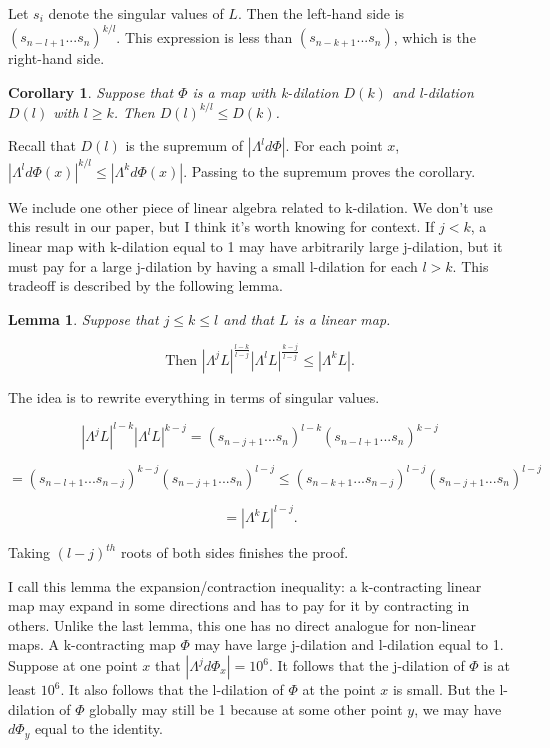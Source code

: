 \documentclass{amsart}
\newtheorem*{Theorem 1}{Theorem 1}
\newtheorem*{Theorem 2}{Theorem 2}
\newtheorem*{Estimate 1}{Estimate 1}
\newtheorem*{Estimate 2}{Estimate 2}
\newtheorem*{key lemma}{Key Lemma}
\newtheorem{lemma}{Lemma}[section]
\newtheorem{corollary}{Corollary}[section]
\numberwithin{equation}{section}
\begin{document}
\proof Let $s_i$ denote the singular values of $L$.  Then the left-hand
side is $(s_{n-l+1} ... s_n)^{k/l}$.  This expression is less than
$(s_{n-k+1} ... s_n)$, which is the right-hand side. \endproof

\begin{corollary} Suppose that $\Phi$ is a map with k-dilation
$D(k)$ and l-dilation $D(l)$ with $l \ge k$.  Then
$D(l)^{k/l} \le D(k)$.
\end{corollary}

\proof Recall that $D(l)$ is the supremum of $| \Lambda^l d \Phi |$.  For
each point $x$, $| \Lambda^l d \Phi(x)|^{k/l} \le |\Lambda^k d \Phi(x)|$.
Passing to the supremum proves the corollary. \endproof

We include one other piece of linear algebra related to
k-dilation.  We don't use this result in our paper, but I think
it's worth knowing for context.  If $j < k$, a linear map with
k-dilation equal to 1 may have arbitrarily large j-dilation, but
it must pay for a large j-dilation by having a small l-dilation
for each $l > k$.  This tradeoff is described by the following
lemma.

\begin{lemma} Suppose that $j \le k \le l$ and that $L$ is a linear map.

$$\textrm{Then } |\Lambda^j L|^{\frac{l-k}{l-j}} |\Lambda^l
L|^{\frac{k-j}{l-j}} \le |\Lambda^k L|.$$

\end{lemma}

\proof The idea is to rewrite everything in terms of singular values.

$$|\Lambda^j L|^{l-k} |\Lambda^l L|^{k-j} = (s_{n-j+1} ...
s_n)^{l-k} (s_{n-l+1} ... s_n)^{k-j}$$

$$ = (s_{n-l+1} ... s_{n-j})^{k-j} (s_{n-j+1} ... s_n)^{l-j} \le
(s_{n-k+1} ... s_{n-j})^{l-j} (s_{n-j+1} ... s_n)^{l-j}$$

$$ = |\Lambda^k L|^{l-j}.$$

Taking $(l-j)^{th}$ roots of both sides finishes the proof. \endproof

I call this lemma the expansion/contraction inequality: a
k-contracting linear map may expand in some directions and has to
pay for it by contracting in others.  Unlike the last lemma, this
one has no direct analogue for non-linear maps.  A k-contracting
map $\Phi$ may have large j-dilation and l-dilation equal to 1. 
Suppose at one point $x$ that $|\Lambda^j d \Phi_x| = 10^6$.  It
follows that the j-dilation of $\Phi$ is at least $10^6$. It also
follows that the l-dilation of $\Phi$ at the point $x$ is small. 
But the l-dilation of $\Phi$ globally may still be 1 because at
some other point $y$, we may have $d\Phi_y$ equal to the
identity.
\end{document}
